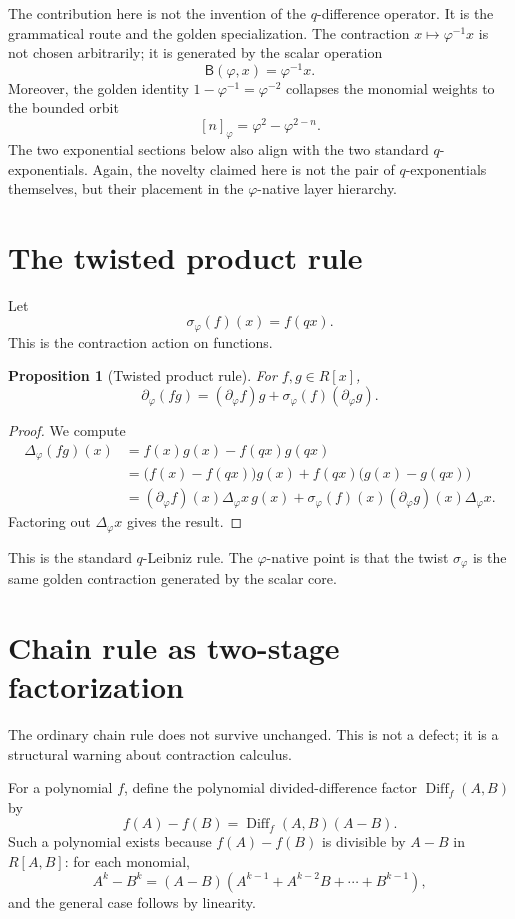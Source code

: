 \documentclass[11pt]{article}
\newtheorem{proposition}[definition]{Proposition}
\newcommand{\B}{\mathsf{B}}
\newcommand{\Diff}{\operatorname{Diff}}
\newcommand{\sig}{\sigma}
\newcommand{\ph}{\varphi}
\newcommand{\dd}{\partial_{\ph}}
\newcommand{\Del}{\Delta_{\ph}}
\begin{document}
The contribution here is not the invention of the $q$-difference operator.  It is the grammatical route and the golden specialization.  The contraction $x\mapsto \ph^{-1}x$ is not chosen arbitrarily; it is generated by the scalar operation
\[
    \B(\ph,x)=\ph^{-1}x.
\]
Moreover, the golden identity $1-\ph^{-1}=\ph^{-2}$ collapses the monomial weights to the bounded orbit
\[
    [n]_{\ph}=\ph^2-\ph^{2-n}.
\]
The two exponential sections below also align with the two standard $q$-exponentials.  Again, the novelty claimed here is not the pair of $q$-exponentials themselves, but their placement in the $\ph$-native layer hierarchy.

\section{The twisted product rule}

Let
\[
    \sig_{\ph}(f)(x)=f(qx).
\]
This is the contraction action on functions.

\begin{proposition}[Twisted product rule]
For $f,g\in R[x]$,
\[
    \dd(fg)=(\dd f)g+\sig_{\ph}(f)(\dd g).
\]
\end{proposition}

\begin{proof}
We compute
\begin{align*}
    \Del(fg)(x)
    &=f(x)g(x)-f(qx)g(qx)\\
    &=\bigl(f(x)-f(qx)\bigr)g(x)
      +f(qx)\bigl(g(x)-g(qx)\bigr)\\
    &=(\dd f)(x)\Del x\,g(x)+\sig_{\ph}(f)(x)(\dd g)(x)\Del x.
\end{align*}
Factoring out $\Del x$ gives the result.
\end{proof}

This is the standard $q$-Leibniz rule.  The $\ph$-native point is that the twist $\sig_{\ph}$ is the same golden contraction generated by the scalar core.

\section{Chain rule as two-stage factorization}

The ordinary chain rule does not survive unchanged.  This is not a defect; it is a structural warning about contraction calculus.

For a polynomial $f$, define the polynomial divided-difference factor $\Diff_f(A,B)$ by
\[
    f(A)-f(B)=\Diff_f(A,B)(A-B).
\]
Such a polynomial exists because $f(A)-f(B)$ is divisible by $A-B$ in $R[A,B]$: for each monomial,
\[
    A^k-B^k=(A-B)(A^{k-1}+A^{k-2}B+\cdots+B^{k-1}),
\]
and the general case follows by linearity.
\end{document}
